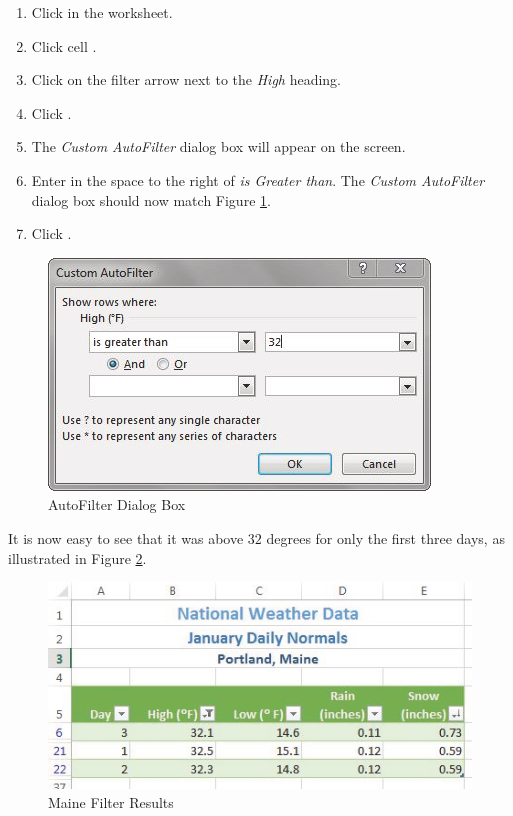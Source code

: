 \begin{enumbox}
	\begin{enumerate}
		\item Click in the  worksheet.
		\item Click cell .
		\item Click on the filter arrow next to the \textit{High} heading.
		\item Click .
		\item The \textit{Custom AutoFilter} dialog box will appear on the screen.
		\item Enter  in the space to the right of \textit{is Greater than}. The \textit{Custom AutoFilter} dialog box should now match Figure \ref{05:fig17}.
		\item Click .
	\end{enumerate}
\end{enumbox}
	
\begin{figure}[H]
	\centering
	\includegraphics[width=\maxwidth{.95\linewidth}]{gfx/ch05_fig17}
	\caption{AutoFilter Dialog Box}
	\label{05:fig17}
\end{figure}

It is now easy to see that it was above $ 32 $ degrees for only the first three days, as illustrated in Figure \ref{05:fig18}.

\begin{figure}[H]
	\centering
	\includegraphics[width=\maxwidth{.95\linewidth}]{gfx/ch05_fig18}
	\caption{Maine Filter Results}
	\label{05:fig18}
\end{figure}

